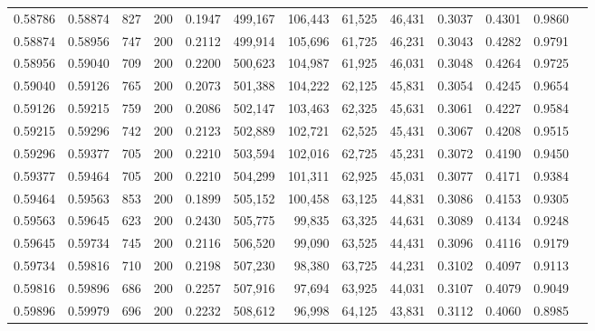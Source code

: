 \begin{tabular}{rrrrrrrrrrrrr}
0.58786 & 0.58874 &   827 & 200 &                                     0.1947 & 499,167 & 106,443 &  61,525 &  46,431 & 0.3037 & 0.4301 & 0.9860 \\
0.58874 & 0.58956 &   747 & 200 &                                     0.2112 & 499,914 & 105,696 &  61,725 &  46,231 & 0.3043 & 0.4282 & 0.9791 \\
0.58956 & 0.59040 &   709 & 200 &                                     0.2200 & 500,623 & 104,987 &  61,925 &  46,031 & 0.3048 & 0.4264 & 0.9725 \\
0.59040 & 0.59126 &   765 & 200 &                                     0.2073 & 501,388 & 104,222 &  62,125 &  45,831 & 0.3054 & 0.4245 & 0.9654 \\
0.59126 & 0.59215 &   759 & 200 &                                     0.2086 & 502,147 & 103,463 &  62,325 &  45,631 & 0.3061 & 0.4227 & 0.9584 \\
0.59215 & 0.59296 &   742 & 200 &                                     0.2123 & 502,889 & 102,721 &  62,525 &  45,431 & 0.3067 & 0.4208 & 0.9515 \\
0.59296 & 0.59377 &   705 & 200 &                                     0.2210 & 503,594 & 102,016 &  62,725 &  45,231 & 0.3072 & 0.4190 & 0.9450 \\
0.59377 & 0.59464 &   705 & 200 &                                     0.2210 & 504,299 & 101,311 &  62,925 &  45,031 & 0.3077 & 0.4171 & 0.9384 \\
0.59464 & 0.59563 &   853 & 200 &                                     0.1899 & 505,152 & 100,458 &  63,125 &  44,831 & 0.3086 & 0.4153 & 0.9305 \\
0.59563 & 0.59645 &   623 & 200 &                                     0.2430 & 505,775 &  99,835 &  63,325 &  44,631 & 0.3089 & 0.4134 & 0.9248 \\
0.59645 & 0.59734 &   745 & 200 &                                     0.2116 & 506,520 &  99,090 &  63,525 &  44,431 & 0.3096 & 0.4116 & 0.9179 \\
0.59734 & 0.59816 &   710 & 200 &                                     0.2198 & 507,230 &  98,380 &  63,725 &  44,231 & 0.3102 & 0.4097 & 0.9113 \\
0.59816 & 0.59896 &   686 & 200 &                                     0.2257 & 507,916 &  97,694 &  63,925 &  44,031 & 0.3107 & 0.4079 & 0.9049 \\
0.59896 & 0.59979 &   696 & 200 &                                     0.2232 & 508,612 &  96,998 &  64,125 &  43,831 & 0.3112 & 0.4060 & 0.8985 \\

\end{tabular}
